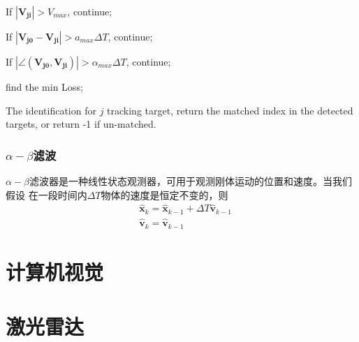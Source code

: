 \quad If $|\bm{V_{ji}}|>V_{max}$, continue;

\quad If $|\bm{V_{j0}}-\bm{V_{ji}}|>a_{max} \Delta T$, continue;

\quad If $|\angle(\bm{V_{j0}},\bm{V_{ji}})|>{\alpha}_{max} \Delta T$, continue;

find the min Loss;

The identification for $j$ tracking target, return the matched index in the
detected targets, or return -1 if un-matched.

\subsubsection{$\alpha-\beta$滤波}
$\alpha-\beta$滤波器是一种线性状态观测器，可用于观测刚体运动的位置和速度。当我们假设
在一段时间内$\Delta T$物体的速度是恒定不变的，则
\begin{equation}
  \begin{aligned}
    &\hat{\bm{x}}_k = \hat{\bm{x}}_{k-1} + \Delta T \hat{\bm{v}}_{k-1} \\
    &\hat{\bm{v}}_k = \hat{\bm{v}}_{k-1}
  \end{aligned}
\end{equation}

\section{计算机视觉}


\section{激光雷达}
